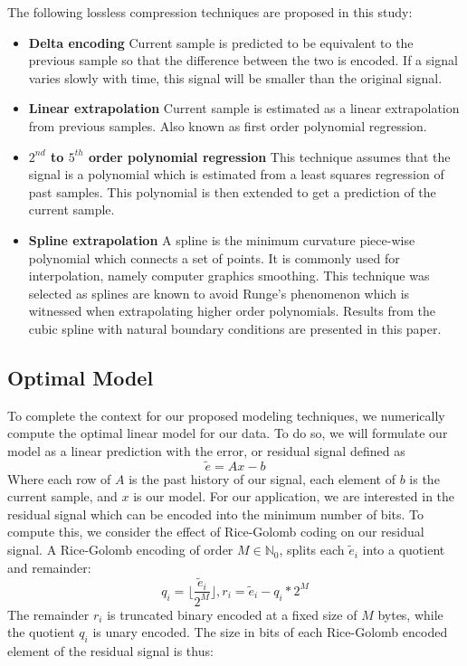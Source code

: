 \documentclass[journal]{IEEEtran}
\begin{document}
The following lossless compression techniques are proposed in this study:
\begin{itemize}
  \item \textbf{Delta encoding} Current sample is predicted to be equivalent to the previous sample so that the difference between the two is encoded. If a signal varies slowly with time, this signal will be smaller than the original signal.
  \item \textbf{Linear extrapolation} Current sample is estimated as a linear extrapolation from previous samples. Also known as first order polynomial regression.
  \item \textbf{\boldmath$2^{nd}$ to \boldmath$5^{th}$ order polynomial regression} This technique assumes that the signal is a polynomial which is estimated from a least squares regression of past samples. This polynomial is then extended to get a prediction of the current sample.
  \item \textbf{Spline extrapolation} A spline is the minimum curvature piece-wise polynomial which connects a set of points. It is commonly used for interpolation, namely computer graphics smoothing. This technique was selected as splines are known to avoid Runge's phenomenon which is witnessed when extrapolating higher order polynomials. Results from the cubic spline with natural boundary conditions are presented in this paper.
\end{itemize}

\subsection{Optimal Model}

To complete the context for our proposed modeling techniques, we numerically compute the optimal linear model for our data. To do so, we will formulate our model as a linear prediction with the error, or residual signal defined as
$$\tilde{e} = Ax-b$$
Where each row of $A$ is the past history of our signal, each element of $b$ is the current sample, and $x$ is our model. For our application, we are interested in the residual signal which can be encoded into the minimum number of bits. To compute this, we consider the effect of Rice-Golomb coding on our residual signal. A Rice-Golomb encoding of order $M \in \mathbb{N}_0$, splits each $\tilde{e}_i$ into a quotient and remainder:
$$ q_i = \lfloor \frac{\tilde{e}_i}{2^M} \rfloor, r_i = \tilde{e}_i - q_i * 2^M  $$
The remainder $r_i$ is truncated binary encoded at a fixed size of $M$ bytes, while the quotient $q_i$ is unary encoded. The size in bits of each Rice-Golomb encoded element of the residual signal is thus:
\end{document}
